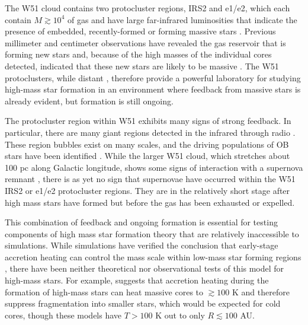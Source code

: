 \documentclass[twocolumn]{aastex61}
\begin{document}

The W51 cloud contains two protocluster regions, IRS2 and e1/e2, which each
contain $M\gtrsim10^4$ \msun of gas and have large far-infrared luminosities
that
indicate the presence of embedded, recently-formed or forming massive stars
\citep{Harvey1986a,Sievers1991a,Ginsburg2012a,Ginsburg2016b}.  Previous
millimeter and centimeter observations have revealed the gas reservoir
that is forming new stars and, because of the high masses of the individual
cores detected, indicated that these new stars are likely to be massive
\citep{Zhang1997a,Eisner2002a,Zapata2009a,Tang2009a,
Zapata2010a,Shi2010b,Shi2010a,Koch2010a,Koch2012a,Koch2012b,Tang2013b,Goddi2016a}.  The
W51 protoclusters, while distant \citep[5.4 kpc;][]{Sato2010a}, therefore
provide a powerful laboratory for studying high-mass star formation in an
environment where feedback from massive stars is already evident, but 
formation is still ongoing.

The protocluster region within W51 exhibits many signs of strong feedback.  In
particular, there are many giant \hii regions detected in the infrared through
radio \citep{Mehringer1994a,Ginsburg2015a}.  These \hii region bubbles exist
on many scales, and the driving populations of OB stars have been identified
\citep{Kumar2004a,Ginsburg2016a}.  While the larger W51 cloud, which stretches
about 100 pc along Galactic longitude, shows some signs of interaction with a
supernova remnant \citep{Brogan2013a,Ginsburg2015a}, there is as yet no
sign that supernovae have occurred within the W51 IRS2 or e1/e2 protocluster
regions.  They are in the relatively short stage after  high mass stars
have formed but before the gas has been exhausted or expelled.

This combination of feedback and ongoing formation is essential for testing
components of high mass star formation theory that are relatively inaccessible
to simulations.  While simulations have verified the conclusion that
early-stage accretion heating can control the mass scale within low-mass star
forming regions \citep{Krumholz2007c, Offner2011b, Bate2012a,Bate2014b,
Guszejnov2015c, Guszejnov2016a,Krumholz2016a}, there
have been neither theoretical nor observational tests of this model for
high-mass stars.   For example, \citet{Krumholz2006a} suggests that accretion
heating during the formation of high-mass stars can heat massive cores to
$\gtrsim100$ K and therefore suppress fragmentation into smaller stars, which
would be expected for cold cores, though these models have $T>100$ K out to
only $R\lesssim100$ AU.  
\end{document}
